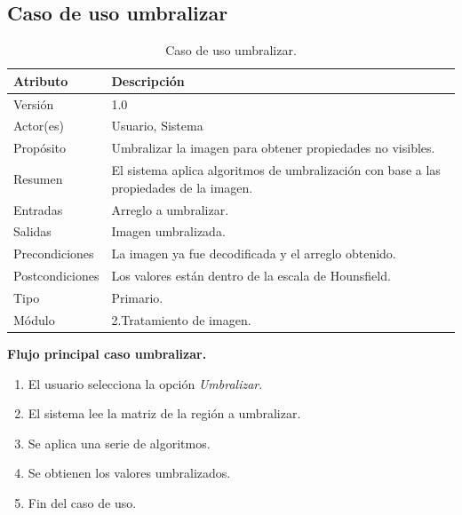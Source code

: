 \documentclass[12pt]{report}
\begin{document}
\subsection{Caso de uso umbralizar}
\begin{table}[H]
\begin{center}
\begin{tabular}{|p{25mm}|p{60mm}|}
\hline
Atributo & Descripción\\
\hline \hline 
Versión & 1.0\\
\hline
Actor(es) & Usuario, Sistema\\
\hline
Propósito & Umbralizar la imagen para obtener propiedades no visibles.\\
\hline
Resumen & El sistema aplica algoritmos de umbralización con base a las propiedades de la imagen.\\
\hline
Entradas & Arreglo a umbralizar.\\
\hline
Salidas & Imagen umbralizada.\\
\hline
Precondiciones & La imagen ya fue decodificada y el arreglo obtenido.\\
\hline
Postcondiciones & Los valores están dentro de la escala de Hounsfield.\\
\hline
Tipo & Primario.\\
\hline 
Módulo & 2.Tratamiento de imagen.\\
\hline
\end{tabular}
\caption{Caso de uso umbralizar.}
\end{center}
\end{table}

\textbf{Flujo principal caso umbralizar. }
\begin{enumerate}
\item El usuario selecciona la opción \textit{Umbralizar}.
\item El sistema lee la matriz de la región a umbralizar.
\item Se aplica una serie de algoritmos.
\item Se obtienen los valores umbralizados.
\item Fin del caso de uso.
\end{enumerate}
\end{document}
